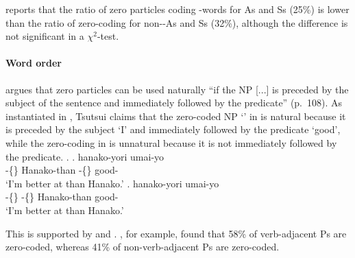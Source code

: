  reports that
the ratio of zero particles coding -words for As and Ss (25\%) is lower than the ratio of zero-coding for non--As and Ss (32\%),
although the difference is not significant in a $\chi^{2}$-test.



\paragraph{Word order}

 argues that
zero particles can be used naturally
``if the NP [...] is preceded by the subject of the sentence and immediately followed by the predicate'' (p.~108).
As instantiated in \Next,
Tsutsui claims that the zero-coded NP  `' in \Next[a] is natural
because it is preceded by the subject  `I' and immediately followed by the predicate  `good',
while the zero-coding in \Next[b] is unnatural because
it is not immediately followed by the predicate.
%
\ex.
 \ag.  hanako-yori  umai-yo \\
      -\{\} Hanako-than -\{\} good- \\
      `I'm better at  than Hanako.'
 \bg.   hanako-yori umai-yo \\
      -\{\} -\{\} Hanako-than good- \\
      `I'm better at  than Hanako.'
      \hfill{\cite[110]{tsutsui84}}

This is supported by  and .
, for example, found that
58\% of verb-adjacent Ps are zero-coded,
whereas 41\% of non-verb-adjacent Ps are zero-coded.

